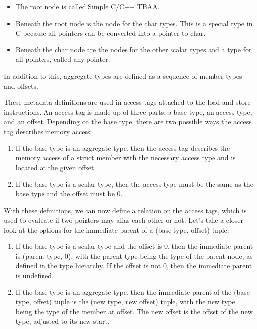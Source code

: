 \begin{itemize}
\item
The root node is called Simple C/C++ TBAA.

\item
Beneath the root node is the node for the char types. This is a special type in C because all pointers can be converted into a pointer to char.

\item
Beneath the char node are the nodes for the other scalar types and a type for all pointers, called any pointer.
\end{itemize}

In addition to this, aggregate types are defined as a sequence of member types and offsets.

These metadata definitions are used in access tags attached to the load and store instructions. An access tag is made up of three parts: a base type, an access type, and an offset. Depending on the base type, there are two possible ways the access tag describes memory access:

\begin{enumerate}
\item
If the base type is an aggregate type, then the access tag describes the memory access of a struct member with the necessary access type and is located at the given offset.

\item
If the base type is a scalar type, then the access type must be the same as the base type and the offset must be 0.
\end{enumerate}

With these definitions, we can now define a relation on the access tags, which is used to evaluate if two pointers may alias each other or not. Let’s take a closer look at the options for the immediate parent of a (base type, offset) tuple:

\begin{enumerate}
\item
If the base type is a scalar type and the offset is 0, then the immediate parent is (parent type, 0), with the parent type being the type of the parent node, as defined in the type hierarchy. If the offset is not 0, then the immediate parent is undefined.

\item
If the base type is an aggregate type, then the immediate parent of the (base type, offset) tuple is the (new type, new offset) tuple, with the new type being the type of the member at offset. The new offset is the offset of the new type, adjusted to its new start.
\end{enumerate}

